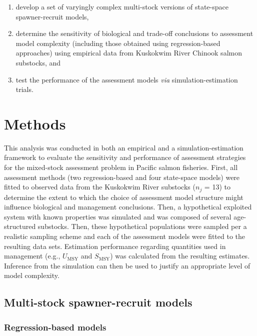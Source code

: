\documentclass[12pt,]{book}
\theoremstyle{definition}
\theoremstyle{definition}
\theoremstyle{definition}
\theoremstyle{remark}
\begin{document}
\begin{enumerate}
\def\labelenumi{(\arabic{enumi})}
\item
  develop a set of varyingly complex multi-stock versions of state-space
  spawner-recruit models,
\item
  determine the sensitivity of biological and trade-off conclusions to
  assessment model complexity (including those obtained using
  regression-based approaches) using empirical data from Kuskokwim River
  Chinook salmon substocks, and
\item
  test the performance of the assessment models \emph{via}
  simulation-estimation trials.
\end{enumerate}

\section{Methods}\label{methods-2}

\noindent
This analysis was conducted in both an empirical and a
simulation-estimation framework to evaluate the sensitivity and
performance of assessment strategies for the mixed-stock assessment
problem in Pacific salmon fisheries. First, all assessment methods (two
regression-based and four state-space models) were fitted to observed
data from the Kuskokwim River substocks (\(n_j\) = 13) to determine the
extent to which the choice of assessment model structure might influence
biological and management conclusions. Then, a hypothetical exploited
system with known properties was simulated and was composed of several
age-structured substocks. Then, these hypothetical populations were
sampled per a realistic sampling scheme and each of the assessment
models were fitted to the resulting data sets. Estimation performance
regarding quantities used in management (e.g., \(U_{\text{MSY}}\) and
\(S_{\text{MSY}}\)) was calculated from the resulting estimates.
Inference from the simulation can then be used to justify an appropriate
level of model complexity.

\subsection{Multi-stock spawner-recruit models}\label{model-methods}

\subsubsection{Regression-based models}\label{reg-methods}
\end{document}
